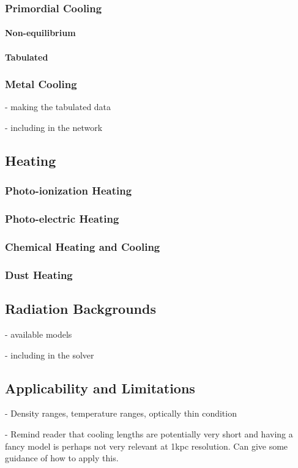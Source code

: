 \subsubsection{Primordial Cooling}

\paragraph{Non-equilibrium}

\paragraph{Tabulated}


\subsubsection{Metal Cooling}
- making the tabulated data

- including in the network


\subsection{Heating}


\subsubsection{Photo-ionization Heating}


\subsubsection{Photo-electric Heating}


\subsubsection{Chemical Heating and Cooling}


\subsubsection{Dust Heating}



\subsection{Radiation Backgrounds}
\label{section:radback}
- available models

- including in the solver


\subsection{Applicability and Limitations}
- Density ranges, temperature ranges, optically thin condition

- Remind reader that cooling lengths are potentially very short and
having a fancy model is perhaps not very relevant at 1kpc
resolution. Can give some guidance of how to apply this.
